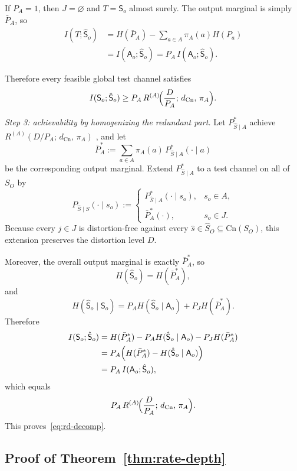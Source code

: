 \documentclass[journal,onecolumn]{IEEEtran}
\makeatletter
\newcommand{\Cn}{\text{Cn}}
\numberwithin{equation}{section}
\renewenvironment{proof}[1][\proofname]{\par
  \pushQED{\qed}%
  \normalfont \topsep6\p@\@plus6\p@\relax
  \trivlist
  \item[\hskip\labelsep
        \itshape
    #1\@addpunct{.}]\ignorespaces
}{%
  \popQED\endtrivlist\@endpefalse
}
\makeatother
\begin{document}
\begin{proof}
If \(P_A=1\), then \(J=\varnothing\) and \(T={\mathsf{S}}_o\) almost surely.
The output marginal is simply \(\bar P_A\), so
\begin{align*}
  I(T;\hat {\mathsf{S}}_o)
  &=
  H(\bar P_A)-\sum_{a\in A}\pi_A(a)H(P_a) \\
  &=
  I(\mathsf{A}_o;\hat{\mathsf{S}}_o)
  =
  P_A\,I(\mathsf{A}_o;\hat{\mathsf{S}}_o).
\end{align*}

Therefore every feasible global test channel satisfies
\[
  I({\mathsf{S}}_o;\hat {\mathsf{S}}_o)
  \ge
  P_A\,
  R^{(A)}\!\Bigl(\frac{D}{P_A};\,d_{\Cn},\,\pi_A\Bigr).
\]

\smallskip\noindent
\emph{Step 3: achievability by homogenizing the redundant part.}
Let \(P_{\hat S\mid A}^*\) achieve
\(R^{(A)}(D/P_A;\,d_{\Cn},\,\pi_A)\)
\cite[Ch.~10]{cover2006elements}
\cite[Ch.~7]{csiszar2011information}, and let
\[
  \bar P_A^*
  :=
  \sum_{a\in A}\pi_A(a)\,P_{\hat S\mid A}^*(\cdot\mid a)
\]
be the corresponding output marginal.
Extend \(P_{\hat S\mid A}^*\) to a test channel on all of \(S_O\) by
\[
  P_{\hat S\mid S}(\cdot\mid s_o)
  :=
  \begin{cases}
    P_{\hat S\mid A}^*(\cdot\mid s_o), & s_o\in A,\\[3pt]
    \bar P_A^*(\cdot), & s_o\in J.
  \end{cases}
\]
Because every \(j\in J\) is distortion-free against every
\(\hat s\in\hat S_O\subseteq\Cn(S_O)\), this extension preserves
the distortion level \(D\).

Moreover, the overall output marginal is exactly \(\bar P_A^*\), so
\[
  H(\hat {\mathsf{S}}_o)=H(\bar P_A^*),
\]
and
\[
  H(\hat {\mathsf{S}}_o\mid {\mathsf{S}}_o)
  =
  P_AH(\hat {\mathsf{S}}_o\mid \mathsf{A}_o)+P_JH(\bar P_A^*).
\]
Therefore
\begin{align*}
  I({\mathsf{S}}_o;\hat {\mathsf{S}}_o)
  &=
  H(\bar P_A^*)-
  P_AH(\hat {\mathsf{S}}_o\mid \mathsf{A}_o)-P_JH(\bar P_A^*) \\
  &=
  P_A\Bigl(H(\bar P_A^*)-H(\hat {\mathsf{S}}_o\mid \mathsf{A}_o)\Bigr) \\
  &=
  P_A\,I(\mathsf{A}_o;\hat{\mathsf{S}}_o),
\end{align*}
which equals
\[
  P_A\,
  R^{(A)}\!\Bigl(\frac{D}{P_A};\,d_{\Cn},\,\pi_A\Bigr).
\]
This proves~\eqref{eq:rd-decomp}.
\end{proof}

\subsection{Proof of Theorem~\ref{thm:rate-depth}}
\label{app:proof-rate-depth}
\end{document}
